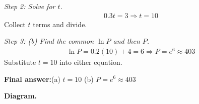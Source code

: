 \documentclass[11pt]{article}
\begin{document}
\textit{Step 2: Solve for \( t \).}
\[\begin{gathered}
0.3t = 3 \Rightarrow t = 10
\end{gathered}\]
Collect \( t \) terms and divide.

\textit{Step 3: (b) Find the common \( \ln P \) and then \( P \).}
\[\begin{gathered}
\ln P = 0.2(10) + 4 = 6 \Rightarrow P = e^6 \approx 403
\end{gathered}\]
Substitute \( t = 10 \) into either equation.

\begin{answerbox}
\textbf{Final answer:}\quad (a) \(\displaystyle  t = 10 \) \quad  (b) \(\displaystyle  P = e^6 \approx 403 \)
\end{answerbox}
\textbf{Diagram.}

\begin{center}
\end{center}
\end{document}
